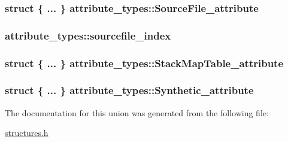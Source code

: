 \subsubsection[{\texorpdfstring{Source\+File\+\_\+attribute}{SourceFile_attribute}}]{\setlength{\rightskip}{0pt plus 5cm}struct \{ ... \}   attribute\+\_\+types\+::\+Source\+File\+\_\+attribute}\hypertarget{unionattribute__types_a4c070f5b3468652a8d4face97c3fc4e8}{}\label{unionattribute__types_a4c070f5b3468652a8d4face97c3fc4e8}
\subsubsection[{\texorpdfstring{sourcefile\+\_\+index}{sourcefile_index}}]{ attribute\+\_\+types\+::sourcefile\+\_\+index}\hypertarget{unionattribute__types_a28b4309a74ee5b3ea7d6738538c7a0d1}{}\label{unionattribute__types_a28b4309a74ee5b3ea7d6738538c7a0d1}
\subsubsection[{\texorpdfstring{Stack\+Map\+Table\+\_\+attribute}{StackMapTable_attribute}}]{\setlength{\rightskip}{0pt plus 5cm}struct \{ ... \}   attribute\+\_\+types\+::\+Stack\+Map\+Table\+\_\+attribute}\hypertarget{unionattribute__types_af40b8d96b4ed7c185e3bbe69ce26d920}{}\label{unionattribute__types_af40b8d96b4ed7c185e3bbe69ce26d920}
\subsubsection[{\texorpdfstring{Synthetic\+\_\+attribute}{Synthetic_attribute}}]{\setlength{\rightskip}{0pt plus 5cm}struct \{ ... \}   attribute\+\_\+types\+::\+Synthetic\+\_\+attribute}\hypertarget{unionattribute__types_a04d1c36708ba372962219177169bedf1}{}\label{unionattribute__types_a04d1c36708ba372962219177169bedf1}


The documentation for this union was generated from the following file\+:\begin{DoxyCompactItemize}
\item 
\hyperlink{structures_8h}{structures.\+h}\end{DoxyCompactItemize}
